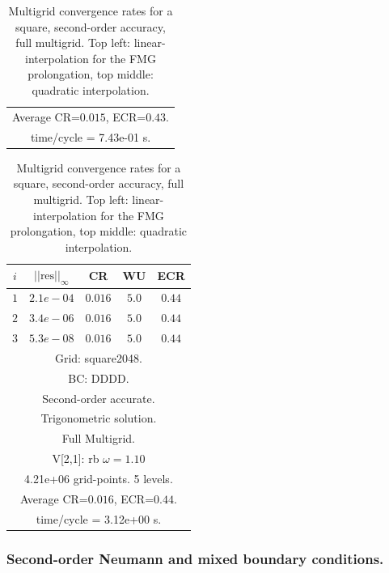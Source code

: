 \begin{table}[hbt]
\begin{center}
{\begin{tabular}{|c|c|c|c|c|}
\multicolumn{5}{|c|}{Average CR=$0.015$, ECR=$0.43$.}  \\
\multicolumn{5}{|c|}{time/cycle = 7.43e-01 s.}  \\
\hline 
\end{tabular}
\begin{tabular}{|c|c|c|c|c|} \hline 
 $i$   & $\vert\vert\mbox{res}\vert\vert_\infty$  &  CR     &  WU    & ECR  \\   \hline 
 $ 1$  & $ 2.1e-04$ & $0.016$ & $ 5.0$ & $0.44$ \\ 
 $ 2$  & $ 3.4e-06$ & $0.016$ & $ 5.0$ & $0.44$ \\ 
 $ 3$  & $ 5.3e-08$ & $0.016$ & $ 5.0$ & $0.44$ \\ 
\hline 
\multicolumn{5}{|c|}{Grid: square2048.}  \\
\multicolumn{5}{|c|}{BC: DDDD.}  \\
\multicolumn{5}{|c|}{Second-order accurate.}  \\
\multicolumn{5}{|c|}{Trigonometric solution.}  \\
\multicolumn{5}{|c|}{Full Multigrid.}  \\
\multicolumn{5}{|c|}{V[2,1]: rb $\omega=1.10$}  \\
\multicolumn{5}{|c|}{4.21e+06 grid-points. 5 levels.}  \\
\multicolumn{5}{|c|}{Average CR=$0.016$, ECR=$0.44$.}  \\
\multicolumn{5}{|c|}{time/cycle = 3.12e+00 s.}  \\
\hline 
\end{tabular}
\qquad %
} %
\end{center}
\caption{Multigrid convergence rates for a square, second-order accuracy, full multigrid. 
Top left: linear-interpolation for the FMG prolongation, top middle: quadratic interpolation.}
\end{table}



\clearpage
\subsubsection{Second-order Neumann and mixed boundary conditions.}

